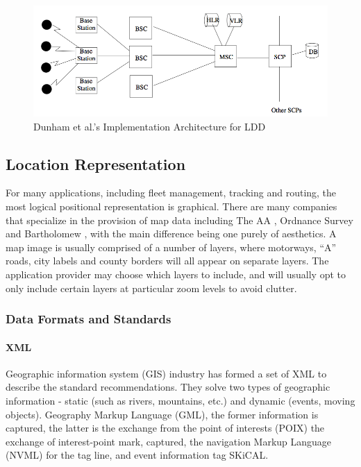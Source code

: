 \documentclass[12pt,a4paper]{article}
\begin{document}
\begin{figure}
\centering
\includegraphics[width=.85\textwidth]{fig/Dunham_LDD}
\caption{Dunham et al.'s Implementation Architecture for LDD}
\label{fig:dunham_ldd}
\end{figure}

\subsection{Location Representation} %
\label{sub:location_representation}
For many applications, including fleet management, tracking and routing, the most logical positional representation is graphical. There are many companies that specialize in the provision of map data including The AA \cite{theaa}, Ordnance Survey \cite{ordnance} and Bartholomew \cite{bartholomew}, with the main difference being one purely of aesthetics. A map image is usually comprised of a number of layers, where motorways, ``A'' roads, city labels and county borders will all appear on separate layers. The application provider may choose which layers to include, and will usually opt to only include certain layers at particular zoom levels to avoid clutter. \cite{DRoza:2003wz}

\subsubsection{Data Formats and Standards} %
\label{ssub:data_formats_and_standards}
\paragraph{XML} %
\label{par:xml}
Geographic information system (GIS) industry has formed a set of XML to describe the standard recommendations. They solve two types of geographic information - static (such as rivers, mountains, etc.) and dynamic (events, moving objects). Geography Markup Language (GML), the former information is captured, the latter is the exchange from the point of interests (POIX) the exchange of interest-point mark, captured, the navigation Markup Language (NVML) for the tag line, and event information tag SKiCAL. \cite{DRoza:2003wz}
\end{document}

